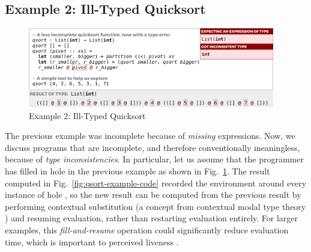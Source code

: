 

\subsection{Example 2: Ill-Typed Quicksort}
\label{sec:static-errors}


\begin{figure}
\centering
\includegraphics[width=0.96\textwidth,interpolate=false,valign=t]{images/qsort-type-error-inset.png}
\caption{Example 2: Ill-Typed Quicksort}
\label{fig:qsort-type-error}
\vspace{-4px}
\end{figure}


The previous example was incomplete 
because of \emph{missing} expressions.
%
Now, we discuss programs that are incomplete, 
and therefore conventionally meaningless, because of
\emph{type inconsistencies}. In particular, 
%
let us 
assume that the programmer has filled in hole  in the previous example 
as shown in Fig.~\ref{fig:qsort-type-error}. 
The result computed in Fig.~\ref{fig:qsort-example-code} recorded the environment around every
instance of hole , so the new result can be computed from the previous result by performing 
contextual substitution (a concept from contextual modal type theory \cite{Nanevski2008})  and resuming evaluation, rather than restarting evaluation entirely.
For larger examples, this \emph{fill-and-resume} operation could significantly reduce evaluation time, which is  
important to perceived liveness \cite{DBLP:conf/icse/Tanimoto13}. 

